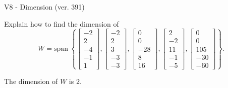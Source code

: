 \begin{exercise}
  \begin{exerciseTitle}V8 - Dimension (ver. 391)\end{exerciseTitle}
  \begin{exerciseStatement}
    Explain how to find the dimension of 
\[W=\mathrm{span}\ \left\{\left[\begin{array}{r}
-2 \\
2 \\
-4 \\
-1 \\
1
\end{array}\right] , \left[\begin{array}{r}
-2 \\
2 \\
3 \\
-3 \\
-3
\end{array}\right] , \left[\begin{array}{r}
0 \\
0 \\
-28 \\
8 \\
16
\end{array}\right] , \left[\begin{array}{r}
2 \\
-2 \\
11 \\
-1 \\
-5
\end{array}\right] , \left[\begin{array}{r}
0 \\
0 \\
105 \\
-30 \\
-60
\end{array}\right]\right\}.\]



  \end{exerciseStatement}
  \begin{exerciseAnswer}
   The dimension of \(W\) is  \(2\).
  


  \end{exerciseAnswer}
\end{exercise}